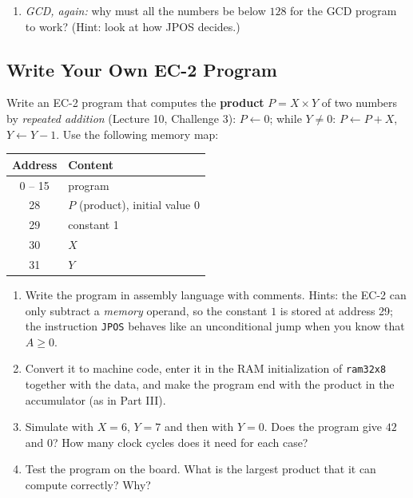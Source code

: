 \documentclass{article}
\begin{document}
\begin{enumerate}
    \item[] \textit{GCD, again:} why must all the numbers be below $128$ for the GCD program to work? (Hint: look at how JPOS decides.)
\end{enumerate}

\subsection*{Write Your Own EC-2 Program}

Write an EC-2 program that computes the \textbf{product} $P = X \times Y$ of two numbers by \emph{repeated addition} (Lecture 10, Challenge 3): $P \leftarrow 0$; while $Y \ne 0$: $P \leftarrow P + X$, $Y \leftarrow Y - 1$. Use the following memory map:

\begin{center}
\begin{tabular}{|c|l|}
    \hline
    \textbf{Address} & \textbf{Content} \\
    \hline
    0 -- 15 & program \\ \hline
    28 & $P$ (product), initial value 0 \\ \hline
    29 & constant 1 \\ \hline
    30 & $X$ \\ \hline
    31 & $Y$ \\ \hline
\end{tabular}
\end{center}

\begin{enumerate}
    \item Write the program in assembly language with comments. Hints: the EC-2 can only subtract a \emph{memory} operand, so the constant $1$ is stored at address 29; the instruction \texttt{JPOS} behaves like an unconditional jump when you know that $A \ge 0$.
    \item Convert it to machine code, enter it in the RAM initialization of \texttt{ram32x8} together with the data, and make the program end with the product in the accumulator (as in Part III).
    \item Simulate with $X = 6$, $Y = 7$ and then with $Y = 0$. Does the program give $42$ and $0$? How many clock cycles does it need for each case?
    \item Test the program on the board. What is the largest product that it can compute correctly? Why?
\end{enumerate}
\end{document}
